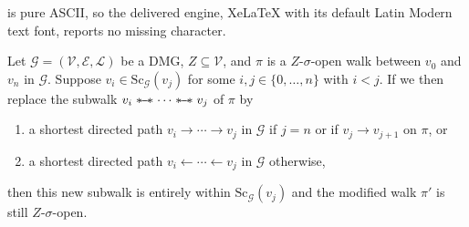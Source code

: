 \documentclass[10pt,a4paper]{amsart}
\newcommand{\hut}{\mathrel{\leftarrow}}
\newcommand{\sus}{\mathrel{{\ast\mkern-11mu\relbar\mkern-9mu\relbar\mkern-11mu\ast}}}
\newcommand{\tuh}{\mathrel{\rightarrow}}
\begin{document}
is pure ASCII, so the delivered engine, XeLaTeX with its default Latin Modern text font, reports no missing character.
\begin{lemma} \label{lemma3.3.10}
Let $\mathcal{G}=(\mathcal{V},\mathcal{E},\mathcal{L})$ be a DMG, $Z\subseteq \mathcal{V}$, and $\pi$ is a $Z$-$\sigma$-open walk between $v_0$ and $v_n$ in $\mathcal{G}$. Suppose $v_i\in\text{Sc}_\mathcal{G}(v_j)$ for some $i,j\in\{0,\ldots,n\}$ with $i<j$. If we then replace the subwalk $v_i\sus\cdots\sus v_j$ of $\pi$ by
\begin{enumerate}
    \item a shortest directed path $v_i\tuh\cdots\tuh v_j$ in $\mathcal{G}$ if $j=n$ or if $v_j\tuh v_{j+1}$ on $\pi$, or
    \item a shortest directed path $v_i\hut\cdots\hut v_j$ in $\mathcal{G}$ otherwise,
\end{enumerate}
then this new subwalk is entirely within $\text{Sc}_\mathcal{G}(v_j)$ and the modified walk $\pi'$ is still $Z$-$\sigma$-open.
\end{lemma}
\end{document}
